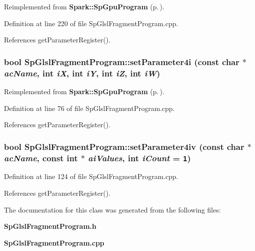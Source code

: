 Reimplemented from {\bf Spark::Sp\-Gpu\-Program} {\rm (p.\,\pageref{classSpark_1_1SpGpuProgram_a27})}.

Definition at line 220 of file Sp\-Glsl\-Fragment\-Program.cpp.

References get\-Parameter\-Register().
\subsubsection{\setlength{\rightskip}{0pt plus 5cm}bool Sp\-Glsl\-Fragment\-Program::set\-Parameter4i (const char $\ast$ {\em ac\-Name}, int {\em i\-X}, int {\em i\-Y}, int {\em i\-Z}, int {\em i\-W})\hspace{0.3cm}{\tt  [virtual]}}\label{classSpark_1_1SpGlslFragmentProgram_a4}




Reimplemented from {\bf Spark::Sp\-Gpu\-Program} {\rm (p.\,\pageref{classSpark_1_1SpGpuProgram_a15})}.

Definition at line 76 of file Sp\-Glsl\-Fragment\-Program.cpp.

References get\-Parameter\-Register().
\subsubsection{\setlength{\rightskip}{0pt plus 5cm}bool Sp\-Glsl\-Fragment\-Program::set\-Parameter4iv (const char $\ast$ {\em ac\-Name}, const int $\ast$ {\em ai\-Values}, int {\em i\-Count} = {\tt 1})\hspace{0.3cm}{\tt  [virtual]}}\label{classSpark_1_1SpGlslFragmentProgram_a8}


Definition at line 124 of file Sp\-Glsl\-Fragment\-Program.cpp.

References get\-Parameter\-Register().

The documentation for this class was generated from the following files:\begin{CompactItemize}
\item 
{\bf Sp\-Glsl\-Fragment\-Program.h}\item 
{\bf Sp\-Glsl\-Fragment\-Program.cpp}\end{CompactItemize}
